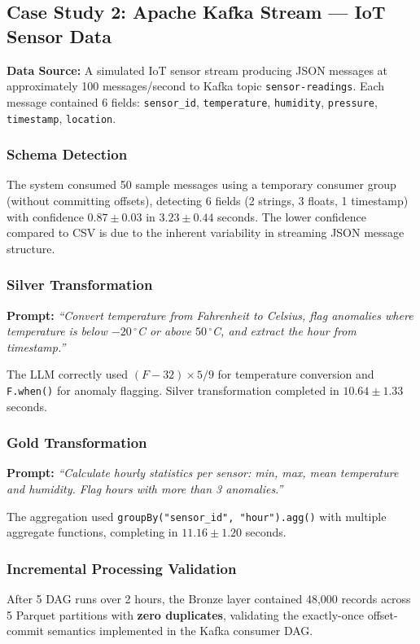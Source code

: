 \documentclass[12pt, a4paper]{article}
\begin{document}
\subsection{Case Study 2: Apache Kafka Stream --- IoT Sensor Data}

\textbf{Data Source:} A simulated IoT sensor stream producing JSON messages at approximately 100 messages/second to Kafka topic \texttt{sensor-readings}. Each message contained 6 fields: \texttt{sensor\_id}, \texttt{temperature}, \texttt{humidity}, \texttt{pressure}, \texttt{timestamp}, \texttt{location}.

\subsubsection{Schema Detection}
The system consumed 50 sample messages using a temporary consumer group (without committing offsets), detecting 6 fields (2 strings, 3 floats, 1 timestamp) with confidence $0.87 \pm 0.03$ in $3.23 \pm 0.44$ seconds. The lower confidence compared to CSV is due to the inherent variability in streaming JSON message structure.

\subsubsection{Silver Transformation}
\textbf{Prompt:} \textit{``Convert temperature from Fahrenheit to Celsius, flag anomalies where temperature is below $-20\,^{\circ}$C or above $50\,^{\circ}$C, and extract the hour from timestamp.''}

The LLM correctly used $(F - 32) \times 5/9$ for temperature conversion and \texttt{F.when()} for anomaly flagging. Silver transformation completed in $10.64 \pm 1.33$ seconds.

\subsubsection{Gold Transformation}
\textbf{Prompt:} \textit{``Calculate hourly statistics per sensor: min, max, mean temperature and humidity. Flag hours with more than 3 anomalies.''}

The aggregation used \texttt{groupBy("sensor\_id", "hour").agg()} with multiple aggregate functions, completing in $11.16 \pm 1.20$ seconds.

\subsubsection{Incremental Processing Validation}
After 5 DAG runs over 2 hours, the Bronze layer contained 48,000 records across 5 Parquet partitions with \textbf{zero duplicates}, validating the exactly-once offset-commit semantics implemented in the Kafka consumer DAG.
\end{document}
